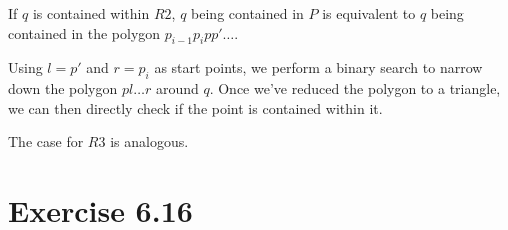 \documentclass[11pt,a4paper]{article}
\begin{document}
If $q$ is contained within $R2$, $q$ being contained in $P$ is equivalent to
$q$ being contained in the polygon $p_{i-1} p_i p p' \ldots$.

Using $l = p'$ and $r = p_i$ as start points, we perform a binary search to
narrow down the polygon $p l \ldots r$ around $q$. Once we've reduced the
polygon to a triangle, we can then directly check if the point is contained
within it.

The case for $R3$ is analogous.


\section{Exercise 6.16}
\end{document}
